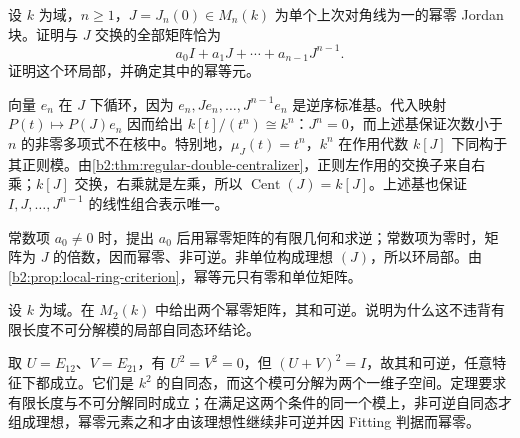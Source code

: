 \begin{exercise}\label{b2:ex:12-jordan-centralizer}
	设 \(k\) 为域，\(n\ge1\)，\(J=J_n(0)\in M_n(k)\) 为单个上次对角线为一的幂零 Jordan 块。证明与 \(J\) 交换的全部矩阵恰为
	\[
		a_0I+a_1J+\cdots+a_{n-1}J^{n-1}.
	\]
	证明这个环局部，并确定其中的幂等元。
\end{exercise}
\begin{solution}
	向量 \(e_n\) 在 \(J\) 下循环，因为 \(e_n,Je_n,\ldots,J^{n-1}e_n\) 是逆序标准基。代入映射 \(P(t)\mapsto P(J)e_n\) 因而给出 \(k[t]/(t^n)\cong k^n\)：\(J^n=0\)，而上述基保证次数小于 \(n\) 的非零多项式不在核中。特别地，\(\mu_J(t)=t^n\)，\(k^n\) 在作用代数 \(k[J]\) 下同构于其正则模。由\cref{b2:thm:regular-double-centralizer}，正则左作用的交换子来自右乘；\(k[J]\) 交换，右乘就是左乘，所以 \(\operatorname{Cent}(J)=k[J]\)。上述基也保证 \(I,J,\ldots,J^{n-1}\) 的线性组合表示唯一。

	常数项 \(a_0\ne0\) 时，提出 \(a_0\) 后用幂零矩阵的有限几何和求逆；常数项为零时，矩阵为 \(J\) 的倍数，因而幂零、非可逆。非单位构成理想 \((J)\)，所以环局部。由\cref{b2:prop:local-ring-criterion}，幂等元只有零和单位矩阵。
\end{solution}

\begin{exercise}\label{b2:ex:12-nilpotent-sum}
	设 \(k\) 为域。在 \(M_2(k)\) 中给出两个幂零矩阵，其和可逆。说明为什么这不违背有限长度不可分解模的局部自同态环结论。
\end{exercise}
\begin{solution}
	取 \(U=E_{12}\)、\(V=E_{21}\)，有 \(U^2=V^2=0\)，但 \((U+V)^2=I\)，故其和可逆，任意特征下都成立。它们是 \(k^2\) 的自同态，而这个模可分解为两个一维子空间。定理要求有限长度与不可分解同时成立；在满足这两个条件的同一个模上，非可逆自同态才组成理想，幂零元素之和才由该理想性继续非可逆并因 Fitting 判据而幂零。
\end{solution}

